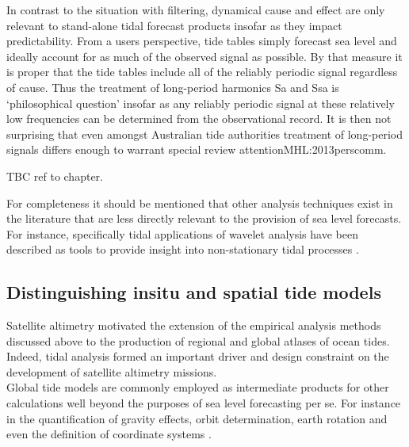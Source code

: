 In contrast to the situation with filtering, dynamical cause and effect are only relevant to stand-alone tidal forecast products insofar as they impact predictability.  From a users perspective, tide tables simply forecast sea level and ideally account for as much of the observed signal as possible.   By that measure it is proper that the tide tables include all of the reliably periodic signal regardless of cause.   
Thus the treatment of long-period harmonics Sa and Ssa is `philosophical question' \citep{Parker:2007wq} insofar as any reliably periodic signal at these relatively low frequencies can be determined from the observational record.  It is then not surprising that even amongst Australian tide authorities treatment of long-period signals differs enough to warrant special review attention{MHL:2013perscomm}.


TBC ref to chapter.

For completeness it should be mentioned that other analysis techniques exist in the literature that are less directly relevant to the provision of sea level forecasts.\\
For instance, specifically tidal applications of wavelet analysis have been described as tools to provide insight into non-stationary tidal processes \citep{Flinchem:2000kp}.



\subsection{Distinguishing insitu and spatial tide models}

Satellite altimetry motivated the extension of the empirical analysis methods discussed above to the production of regional and global atlases of ocean tides.  Indeed, tidal analysis formed an important driver and design constraint on the development of satellite altimetry missions.\\
Global tide models are commonly employed as intermediate products for other calculations well beyond the purposes of sea level forecasting per se.  For instance in the quantification of gravity effects, orbit determination, earth rotation and even the definition of coordinate systems \citep{Anonymous:2004tm}.\\



